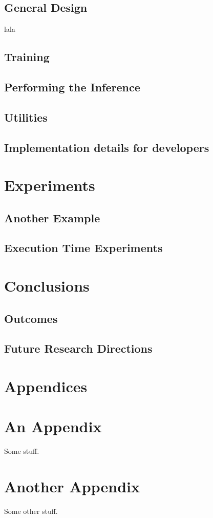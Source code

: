 \documentclass[11pt,twoside]{article}
\numberwithin{Theorem}{section}
\numberwithin{Definition}{section}
\numberwithin{Lemma}{section}
\numberwithin{Algorithm}{section}
\numberwithin{equation}{section}
\begin{document}
\subsection{General Design}
\label{subsec:general_design}
% 

lala
\subsection{Training}
\label{subsec:training}

\subsection{Performing the Inference}
\label{subsec:inference}

\subsection{Utilities}
\label{subsec:utilities}

\subsection{Implementation details for developers}
\label{subsec:developers}

\clearpage
\section{Experiments}

\subsection{Another Example}

\subsection{Execution Time Experiments}

\section{Conclusions}

\subsection{Outcomes}

\subsection{Future Research Directions}
\clearpage

\printbibliography
\clearpage

\appendix
\section*{Appendices}

\clearpage
\section{An Appendix}
\label{app:one}

Some stuff.
\clearpage

\section{Another Appendix}
\label{app:two}

Some other stuff.
\end{document}
